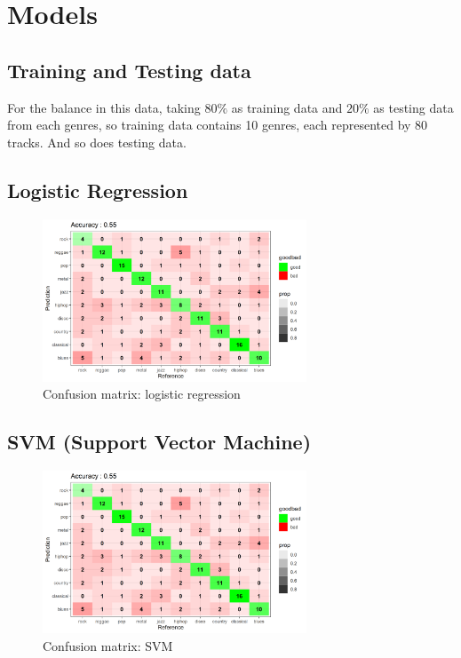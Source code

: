 \documentclass[12pt,a4paper]{article}
\begin{document}
\section{Models}
\subsection{Training and Testing data}
For the balance in this data, taking $80\%$ as training data and $20\%$ as testing data from each genres, so training data contains 10 genres, each represented by 80 tracks. And so does testing data.
\subsection{Logistic Regression}
\begin{figure}[h]
    \begin{center}
        \includegraphics[width=0.7\textwidth]{confusionMatrix_logreg.png}
    \end{center}
    \caption{Confusion matrix: logistic regression}
\end{figure}
\newpage
\subsection{SVM (Support Vector Machine)}
\begin{figure}[h]
    \begin{center}
        \includegraphics[width=0.7\textwidth]{confusionMatrix_logreg.png}
    \end{center}
    \caption{Confusion matrix: SVM}
\end{figure}
\end{document}
